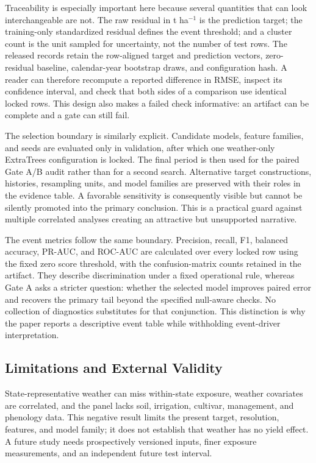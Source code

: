 \documentclass[conference]{IEEEtran}
\begin{document}
Traceability is especially important here because several quantities that can look
interchangeable are not. The raw residual in t ha$^{-1}$ is the prediction target;
the training-only standardized residual defines the event threshold; and a cluster
count is the unit sampled for uncertainty, not the number of test rows. The released
records retain the row-aligned target and prediction vectors, zero-residual baseline,
calendar-year bootstrap draws, and configuration hash. A reader can therefore
recompute a reported difference in RMSE, inspect its confidence interval, and check
that both sides of a comparison use identical locked rows. This design also makes a
failed check informative: an artifact can be complete and a gate can still fail.

The selection boundary is similarly explicit. Candidate models, feature families,
and seeds are evaluated only in validation, after which one weather-only ExtraTrees
configuration is locked. The final period is then used for the paired Gate A/B audit
rather than for a second search. Alternative target constructions, histories,
resampling units, and model families are preserved with their roles in the evidence
table. A favorable sensitivity is consequently visible but cannot be silently
promoted into the primary conclusion. This is a practical guard against multiple
correlated analyses creating an attractive but unsupported narrative.

The event metrics follow the same boundary. Precision, recall, F1, balanced
accuracy, PR-AUC, and ROC-AUC are calculated over every locked row using the fixed
zero score threshold, with the confusion-matrix counts retained in the artifact.
They describe discrimination under a fixed operational rule, whereas Gate A asks a
stricter question: whether the selected model improves paired error and recovers
the primary tail beyond the specified null-aware checks. No collection of
diagnostics substitutes for that conjunction. This distinction is why the paper
reports a descriptive event table while withholding event-driver interpretation.

\subsection{Limitations and External Validity}
State-representative weather can miss within-state exposure, weather covariates are
correlated, and the panel lacks soil, irrigation, cultivar, management, and
phenology data. This negative result limits the present target, resolution,
features, and model family; it does not establish that weather has no yield effect.
A future study needs prospectively versioned inputs, finer exposure measurements,
and an independent future test interval.
\end{document}
